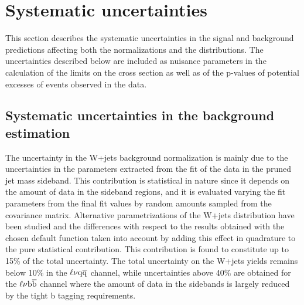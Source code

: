 \section{Systematic uncertainties}\label{sec:systUnc}

This section describes the systematic uncertainties in the signal and background predictions affecting both the normalizations and the \mlvj distributions.
The uncertainties described below are included as nuisance parameters in the calculation of the limits on the cross section as well as of the p-values of potential excesses of events
observed in the data. %

\subsection{Systematic uncertainties in the background estimation}\label{subsec:uncBkg}

The uncertainty in the W+jets background normalization is mainly due to the uncertainties in the parameters extracted from the fit of the data in the pruned jet mass sideband. This contribution is statistical in nature since it depends on the amount of data in the \mJ sideband regions, and it is evaluated varying the fit parameters from the final fit values by random amounts sampled from the covariance matrix.
Alternative parametrizations of the W+jets \mJ distribution have been studied and the differences with respect to the results obtained with the chosen default function taken into account by adding this effect in quadrature to the pure statistical contribution.
This contribution is found to constitute up to 15\% of the total uncertainty. The total uncertainty on the W+jets yields remains below 10\% in the $\ell\nu\mathrm{q}\overline{\mathrm{q}}$ channel, while uncertainties above 40\% are obtained for the $\ell\nu{\mathrm{b}\overline{\mathrm{b}}}$ channel where the amount of data in the sidebands is largely reduced by the tight b tagging requirements.

